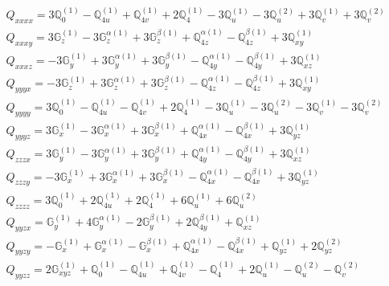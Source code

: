 \documentclass[fleqn,8pt,landscape]{jsarticle}
\begin{document}
\begin{align*}
& Q_{xxxx} = 3 \mathbb{Q}_{0}^{(1)} - \mathbb{Q}_{4u}^{(1)} + \mathbb{Q}_{4v}^{(1)} + 2 \mathbb{Q}_{4}^{(1)} - 3 \mathbb{Q}_{u}^{(1)} - 3 \mathbb{Q}_{u}^{(2)} + 3 \mathbb{Q}_{v}^{(1)} + 3 \mathbb{Q}_{v}^{(2)} \\
& Q_{xxxy} = 3 \mathbb{G}_{z}^{(1)} - 3 \mathbb{G}_{z}^{\alpha(1)} + 3 \mathbb{G}_{z}^{\beta(1)} + \mathbb{Q}_{4z}^{\alpha(1)} - \mathbb{Q}_{4z}^{\beta(1)} + 3 \mathbb{Q}_{xy}^{(1)} \\
& Q_{xxxz} = - 3 \mathbb{G}_{y}^{(1)} + 3 \mathbb{G}_{y}^{\alpha(1)} + 3 \mathbb{G}_{y}^{\beta(1)} - \mathbb{Q}_{4y}^{\alpha(1)} - \mathbb{Q}_{4y}^{\beta(1)} + 3 \mathbb{Q}_{xz}^{(1)} \\
& Q_{yyyx} = - 3 \mathbb{G}_{z}^{(1)} + 3 \mathbb{G}_{z}^{\alpha(1)} + 3 \mathbb{G}_{z}^{\beta(1)} - \mathbb{Q}_{4z}^{\alpha(1)} - \mathbb{Q}_{4z}^{\beta(1)} + 3 \mathbb{Q}_{xy}^{(1)} \\
& Q_{yyyy} = 3 \mathbb{Q}_{0}^{(1)} - \mathbb{Q}_{4u}^{(1)} - \mathbb{Q}_{4v}^{(1)} + 2 \mathbb{Q}_{4}^{(1)} - 3 \mathbb{Q}_{u}^{(1)} - 3 \mathbb{Q}_{u}^{(2)} - 3 \mathbb{Q}_{v}^{(1)} - 3 \mathbb{Q}_{v}^{(2)} \\
& Q_{yyyz} = 3 \mathbb{G}_{x}^{(1)} - 3 \mathbb{G}_{x}^{\alpha(1)} + 3 \mathbb{G}_{x}^{\beta(1)} + \mathbb{Q}_{4x}^{\alpha(1)} - \mathbb{Q}_{4x}^{\beta(1)} + 3 \mathbb{Q}_{yz}^{(1)} \\
& Q_{zzzx} = 3 \mathbb{G}_{y}^{(1)} - 3 \mathbb{G}_{y}^{\alpha(1)} + 3 \mathbb{G}_{y}^{\beta(1)} + \mathbb{Q}_{4y}^{\alpha(1)} - \mathbb{Q}_{4y}^{\beta(1)} + 3 \mathbb{Q}_{xz}^{(1)} \\
& Q_{zzzy} = - 3 \mathbb{G}_{x}^{(1)} + 3 \mathbb{G}_{x}^{\alpha(1)} + 3 \mathbb{G}_{x}^{\beta(1)} - \mathbb{Q}_{4x}^{\alpha(1)} - \mathbb{Q}_{4x}^{\beta(1)} + 3 \mathbb{Q}_{yz}^{(1)} \\
& Q_{zzzz} = 3 \mathbb{Q}_{0}^{(1)} + 2 \mathbb{Q}_{4u}^{(1)} + 2 \mathbb{Q}_{4}^{(1)} + 6 \mathbb{Q}_{u}^{(1)} + 6 \mathbb{Q}_{u}^{(2)} \\
& Q_{yyzx} = \mathbb{G}_{y}^{(1)} + 4 \mathbb{G}_{y}^{\alpha(1)} - 2 \mathbb{G}_{y}^{\beta(1)} + 2 \mathbb{Q}_{4y}^{\beta(1)} + \mathbb{Q}_{xz}^{(1)} \\
& Q_{yyzy} = - \mathbb{G}_{x}^{(1)} + \mathbb{G}_{x}^{\alpha(1)} - \mathbb{G}_{x}^{\beta(1)} + \mathbb{Q}_{4x}^{\alpha(1)} - \mathbb{Q}_{4x}^{\beta(1)} + \mathbb{Q}_{yz}^{(1)} + 2 \mathbb{Q}_{yz}^{(2)} \\
& Q_{yyzz} = 2 \mathbb{G}_{xyz}^{(1)} + \mathbb{Q}_{0}^{(1)} - \mathbb{Q}_{4u}^{(1)} + \mathbb{Q}_{4v}^{(1)} - \mathbb{Q}_{4}^{(1)} + 2 \mathbb{Q}_{u}^{(1)} - \mathbb{Q}_{u}^{(2)} - \mathbb{Q}_{v}^{(2)} \\

\end{align*}
\end{document}

